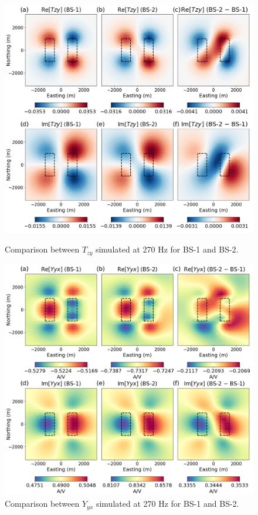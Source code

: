 \documentclass{segabs}
\begin{document}
\begin{figure}[t!]
\includegraphics[width=\columnwidth]{images/anomalies_tipper.png}
\vspace{-20pt}
\caption{Comparison between $T_{zy}$ simulated at 270 Hz for BS-1 and BS-2.}
\label{fig:tipper_anomalies}
\vspace{10pt}
\includegraphics[width=\columnwidth]{images/anomalies_admittance.png}
\vspace{-20pt}
\caption{Comparison between $Y_{yx}$ simulated at 270 Hz for BS-1 and BS-2.}
\label{fig:admittance_anomalies}
\vspace{-10pt}
\end{figure}
\end{document}
